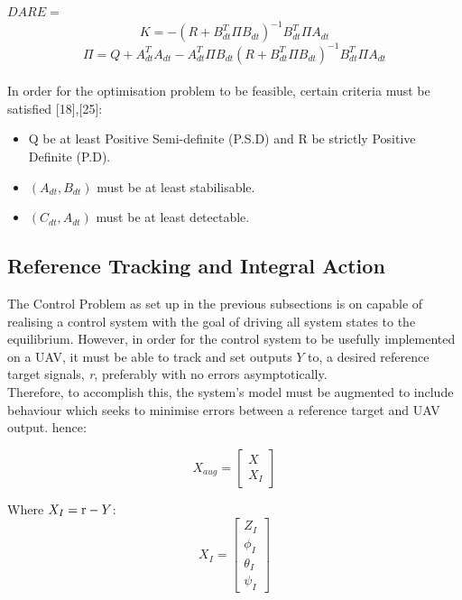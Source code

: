 \documentclass[12pt,a4paper,twoside]{report}
\begin{document}
				\(DARE = \)
				\[
					K = - (R + B_{dt}^{T} \Pi B_{dt})^{-1} B_{dt}^{T} \Pi A_{dt}
				\]
				\begin{equation}
					\Pi = Q + A_{dt}^{T} A_{dt} - A_{dt}^{T} \Pi B_{dt}(R + B_{dt}^{T} \Pi B_{dt})^{-1} B_{dt}^{T} \Pi A_{dt}
				\end{equation}
				\\
				In order for the optimisation problem to be feasible, certain criteria must be satisfied [18],[25]:
				
				\begin{itemize}
					\item
						Q be at least Positive Semi-definite (P.S.D) and R be strictly Positive Definite (P.D).
					\item
						\( (A_{dt},B_{dt}) \) must be at least stabilisable.
					\item
						\( (C_{dt},A_{dt}) \) must be at least detectable.
				\end{itemize} 
			
			\subsection{Reference Tracking and Integral Action}
				
				The Control Problem as set up in the previous subsections is on capable of realising a control system with the goal of driving all system states to the equilibrium. However, in order for the control system to be usefully implemented on a UAV, it must be able to track and set outputs $Y$ to, a desired reference target signals, \emph{\emph{r}}, preferably with no errors asymptotically.
				\\
				Therefore, to accomplish this, the system's model must be augmented to include behaviour which seeks to minimise errors between a reference target and UAV output. hence:
				
				\begin{equation}
					X_{aug} = 
					\begin{bmatrix}
						X \\
						X_I
					\end{bmatrix}
				\end{equation}
				
				Where 	\(X_I = \emph{\emph{r}} - Y \):
				\begin{equation}
					X_I =
					\begin{bmatrix}
						Z_I \\
						\phi_I\\
						\theta_I\\
						\psi_I
					\end{bmatrix}
				\end{equation}
				
\end{document}
